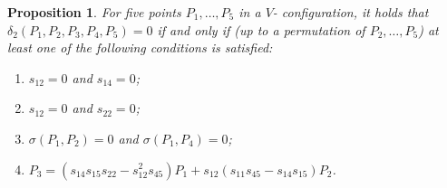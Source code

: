 \documentclass[a4paper, 11pt, reqno]{amsart}
\theoremstyle{plain}
\newtheorem{prop}[lemma]{Proposition}
\theoremstyle{definition}
\begin{document}
%
\begin{prop}
\label{prop:definitionP3}
For five points $P_1, \dots, P_5$ in a $V$- configuration, it holds that
$\delta_2(P_1, P_2, P_3, P_4, P_5) = 0$ if and only if (up to a permutation of $P_2, \dots, P_5$) at least one of the following conditions
is satisfied:
%
\begin{enumerate}
  \item $s_{12} = 0$ and $s_{14} = 0$;
  \label{defP3_1}
  \item $s_{12} = 0$ and $s_{22} = 0$;
  \label{defP3_2}
  \item $\sigma(P_1, P_2) = 0$ and $\sigma(P_1, P_4) = 0$;
  \label{defP3_3}
  \item $P_3 = (s_{14}s_{15}s_{22}-s_{12}^2s_{45})P_1  +s_{12}(s_{11}s_{45}-s_{14}s_{15})P_2$.
  \label{defP3_4}
\end{enumerate}
%
\end{prop}
\end{document}
